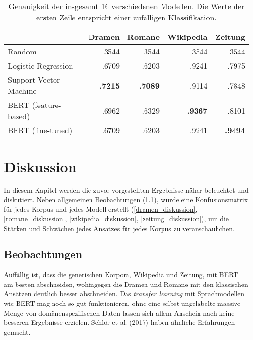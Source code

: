 \begin{table}
\centering
\begin{tabular}{lrrrr}
\toprule
{} & Dramen &  Romane & Wikipedia & Zeitung\\
\midrule

Random& .3544&.3544&.3544&.3544 \\
Logistic Regression&.6709&.6203&.9241&.7975 \\
Support Vector Machine&\textbf{.7215}&\textbf{.7089}&.9114&.7848 \\
BERT (feature-based)&.6962&.6329&\textbf{.9367}&.8101 \\
BERT (fine-tuned)&.6709&.6203&.9241&\textbf{.9494} \\

\bottomrule
\end{tabular}
\caption{Genauigkeit der insgesamt 16 verschiedenen Modellen. Die Werte der ersten Zeile entspricht einer zufälligen Klassifikation.}
\label{scoretable}
\end{table}




\chapter{Diskussion}
\label{diskussion}
In diesem Kapitel werden die zuvor vorgestellten Ergebnisse näher beleuchtet und diskutiert. Neben allgemeinen Beobachtungen (\ref{beobachtungen}), wurde eine Konfusionsmatrix für jedes Korpus und jedes Modell erstellt (\ref{dramen_diskussion}, \ref{romane_diskussion}, \ref{wikipedia_diskussion}, \ref{zeitung_diskussion}), um die Stärken und Schwächen jedes Ansatzes für jedes Korpus zu veranschaulichen.


\section{Beobachtungen}
\label{beobachtungen}
Auffällig ist, dass die generischen Korpora, Wikipedia und Zeitung, mit BERT am besten abschneiden, wohingegen die Dramen und Romane mit den 
klassischen Ansätzen deutlich besser abschneiden. Das \textit{transfer learning} mit Sprachmodellen wie BERT 
mag noch so gut funktionieren, ohne eine selbst ungelabelte massive Menge von domänenspezifischen Daten lassen sich allem Anschein nach keine 
besseren Ergebnisse erzielen. Schlör et al. (2017) haben ähnliche Erfahrungen gemacht.

